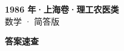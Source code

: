\documentclass[zihao=-4, a4paper]{ctexart}
\begin{document}
\begin{center}
  {\Large\bfseries 1986 年·上海卷·理工农医类}\\[4pt]
  {\large 数学 · 简答版}
\end{center}
\medskip
{}

\clearpage
{}
\begin{center}{\Large\bfseries 答案速查}\end{center}
\medskip

\end{document}
